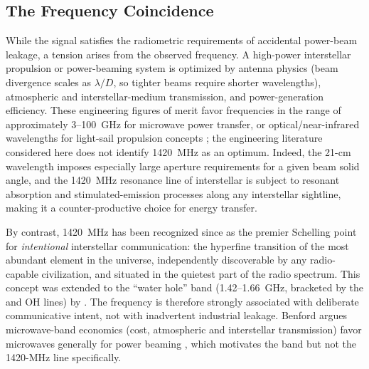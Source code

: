 \documentclass[twocolumn]{aastex701}
\begin{document}
\subsection{The Frequency Coincidence}

While the signal satisfies the radiometric requirements of accidental power-beam leakage, a tension arises from the observed frequency. A high-power interstellar propulsion or power-beaming system is optimized by antenna physics (beam divergence scales as $\lambda/D$, so tighter beams require shorter wavelengths), atmospheric and interstellar-medium transmission, and power-generation efficiency. These engineering figures of merit favor frequencies in the range of approximately 3--100~GHz for microwave power transfer, or optical/near-infrared wavelengths for light-sail propulsion concepts \citep{benford2010}; the engineering literature considered here does not identify 1420~MHz as an optimum. Indeed, the 21-cm wavelength imposes especially large aperture requirements for a given beam solid angle, and the 1420~MHz resonance line of interstellar  is subject to resonant absorption and stimulated-emission processes along any interstellar sightline, making it a counter-productive choice for energy transfer.

By contrast, 1420~MHz has been recognized since \citet{cocconi1959} as the premier Schelling point for \emph{intentional} interstellar communication: the hyperfine transition of the most abundant element in the universe, independently discoverable by any radio-capable civilization, and situated in the quietest part of the radio spectrum. This concept was extended to the ``water hole'' band (1.42--1.66~GHz, bracketed by the  and OH lines) by \citet{oliver1971}. The frequency is therefore strongly associated with deliberate communicative intent, not with inadvertent industrial leakage. Benford argues microwave-band economics (cost, atmospheric and interstellar transmission) favor microwaves generally for power beaming \citep{benford2021}, which motivates the band but not the 1420-MHz line specifically.
\end{document}
